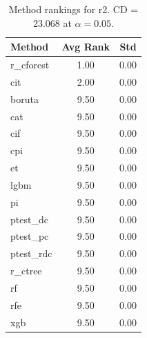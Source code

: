 \begin{table}[h]
\centering
\caption{Method rankings for r2. CD = 23.068 at $\alpha=0.05$.}
\label{tab:ranks_r2}
\begin{tabular}{lcc}
\toprule
Method & Avg Rank & Std \\
\midrule
r_cforest & 1.00 & 0.00 \\
cit & 2.00 & 0.00 \\
boruta & 9.50 & 0.00 \\
cat & 9.50 & 0.00 \\
cif & 9.50 & 0.00 \\
cpi & 9.50 & 0.00 \\
et & 9.50 & 0.00 \\
lgbm & 9.50 & 0.00 \\
pi & 9.50 & 0.00 \\
ptest_dc & 9.50 & 0.00 \\
ptest_pc & 9.50 & 0.00 \\
ptest_rdc & 9.50 & 0.00 \\
r_ctree & 9.50 & 0.00 \\
rf & 9.50 & 0.00 \\
rfe & 9.50 & 0.00 \\
xgb & 9.50 & 0.00 \\
\bottomrule
\end{tabular}
\end{table}